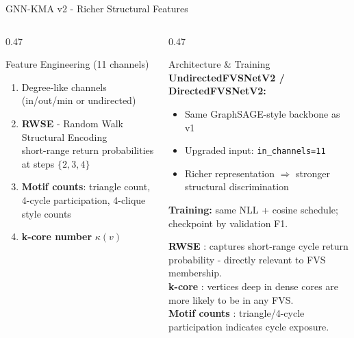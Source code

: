 \documentclass[aspectratio=169]{beamer}
\renewcommand{\footnotesize}{\tiny}
\begin{document}
\begin{frame}{GNN-KMA v2 - Richer Structural Features}
	\tiny
	\begin{columns}[T]
		\begin{column}{0.47\textwidth}
			\begin{block}{Feature Engineering (11 channels)}
				\begin{enumerate}\setlength\itemsep{2pt}
					\item Degree-like channels (in/out/min or undirected)
					\item \textbf{RWSE} - Random Walk Structural Encoding
					      \cite{dwivedi2021}\\
					      {\footnotesize short-range return probabilities at steps
					      $\{2,3,4\}$}
					\item \textbf{Motif counts}: triangle count,
					      4-cycle participation, 4-clique style counts \cite{ahmed2015}
					\item \textbf{k-core number} $\kappa(v)$ \cite{batagelj2003}
				\end{enumerate}
			\end{block}
		\end{column}
		\begin{column}{0.47\textwidth}
			\begin{block}{Architecture \& Training}
				\textbf{UndirectedFVSNetV2 / DirectedFVSNetV2:}
				\begin{itemize}
					\item Same GraphSAGE-style backbone as v1
					\item Upgraded input: \texttt{in\_channels=11}
					\item Richer representation $\Rightarrow$ stronger
					      structural discrimination
				\end{itemize}
				\vspace{4pt}
				\textbf{Training:} same NLL + cosine schedule;
				checkpoint by validation F1.
			\end{block}
			\vspace{4pt}
			\begin{tcolorbox}[algbox,title=Why These Features?]
				\footnotesize
				\textbf{RWSE} \cite{dwivedi2021}: captures short-range cycle
				return probability - directly relevant to FVS membership.\\[3pt]
				\textbf{k-core} \cite{batagelj2003}: vertices deep in dense
				cores are more likely to be in any FVS.\\[3pt]
				\textbf{Motif counts} \cite{ahmed2015}: triangle/4-cycle
				participation indicates cycle exposure.
			\end{tcolorbox}
		\end{column}
	\end{columns}
\end{frame}
\end{document}
